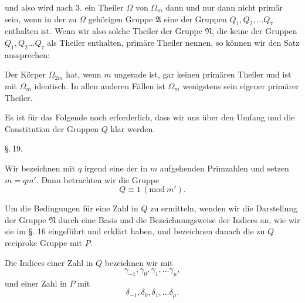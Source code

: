 und also wird nach 3. ein Theiler $\Omega$ von $\Omega_m$ dann und nur
dann nicht primär sein, wenn in der zu $\Omega$ gehörigen Gruppe $\mathfrak{A}$
eine der Gruppen $Q_1, Q_2, \ldots Q_\tau$ enthalten ist. Wenn wir also
solche Theiler der Gruppe $\mathfrak{N}$, die keine der Gruppen $Q_1, Q_2 \ldots Q_\tau$
als Theiler enthalten, primäre Theiler nennen, so können wir
den Satz aussprechen:



Der Körper $\Omega_{2m}$ hat, wenn $m$ ungerade ist, gar keinen primären Theiler und ist mit $\Omega_m$ identisch. In allen anderen Fällen
ist $\Omega_m$ wenigstens sein eigener primärer Theiler.

Es ist für das Folgende noch erforderlich, dass wir uns
über den Umfang und die Constitution der Gruppen $Q$ klar
werden.

\begin{center}
\S.\,19.

\end{center}

Wir bezeichnen mit $q$ irgend eine der in $m$ aufgehenden
Primzahlen und setzen $m = q m'$. Dann betrachten wir die
Gruppe
\[
Q \equiv 1\,(\mathrm{mod}\ m').
\]

Um die Bedingungen für eine Zahl in $Q$ zu ermitteln, wenden
wir die Darstellung der Gruppe $\mathfrak{N}$ durch eine Basis und die
Bezeichnungsweise der Indices an, wie wir sie im §. 16 eingeführt
und erklärt haben, und bezeichnen danach die zu $Q$ reciproke
Gruppe mit $P$.

Die Indices einer Zahl in $Q$ bezeichnen wir mit
\[
\gamma_{-1}, \gamma_0, \gamma_1, \ldots \gamma_\mu,
\]
und einer Zahl in $P$ mit
\[
\delta_{-1}, \delta_0, \delta_1, \ldots \delta_\mu.
\]

